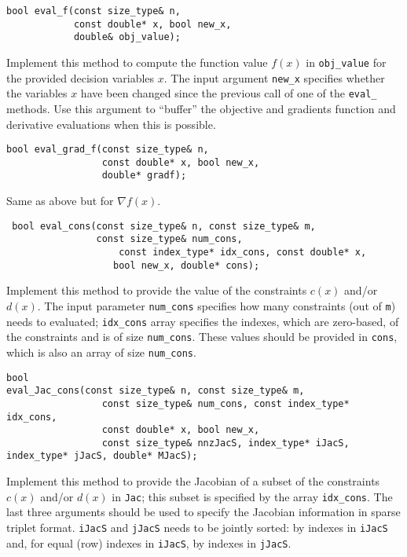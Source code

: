 \begin{lstlisting} 
bool eval_f(const size_type& n, 
            const double* x, bool new_x, 
            double& obj_value);
\end{lstlisting} 

\noindent Implement this method to compute the function value $f(x)$ in \texttt{obj\_value} for the provided decision variables $x$. The input argument \texttt{new\_x} specifies whether the variables $x$ have been changed since the previous call of one of the \texttt{eval\_} methods. Use this argument to ``buffer'' the objective and gradients function and derivative evaluations when this is possible.

\begin{lstlisting} 
bool eval_grad_f(const size_type& n, 
                 const double* x, bool new_x, 
                 double* gradf);
\end{lstlisting} 

\noindent Same as above but for $\nabla f(x)$.

\begin{lstlisting} 
 bool eval_cons(const size_type& n, const size_type& m, 
                const size_type& num_cons,
				    const index_type* idx_cons, const double* x, 
			       bool new_x, double* cons);
\end{lstlisting} 

\noindent Implement this method to provide the value of the constraints $c(x)$ and/or $d(x)$. The input parameter \texttt{num\_cons} specifies how many constraints (out of \texttt{m}) needs to evaluated; \texttt{idx\_cons} array specifies the indexes, which are zero-based, of the constraints  and is of size \texttt{num\_cons}. These values should be provided in \texttt{cons}, which is also an array of size \texttt{num\_cons}.



\begin{lstlisting} 
bool 
eval_Jac_cons(const size_type& n, const size_type& m, 
			     const size_type& num_cons, const index_type* idx_cons,  
			     const double* x, bool new_x,
			     const size_type& nnzJacS, index_type* iJacS, index_type* jJacS, double* MJacS);
\end{lstlisting} 

\noindent Implement this method to provide the Jacobian of a subset of the  constraints $c(x)$ and/or $d(x)$ in \texttt{Jac}; this subset is specified by the array \texttt{idx\_cons}. The last three arguments should be used to specify the Jacobian information in sparse triplet format.  \texttt{iJacS} and \texttt{jJacS} needs to be jointly sorted: by indexes in \texttt{iJacS} and, for equal (row) indexes in \texttt{iJacS}, by indexes in \texttt{jJacS}.

